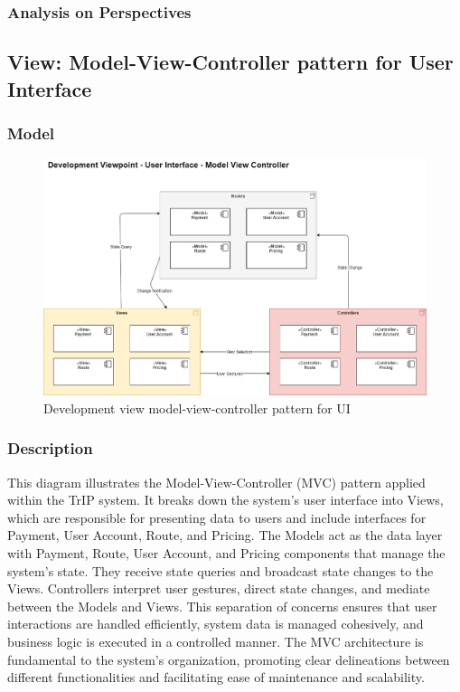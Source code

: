 \subsubsection{Analysis on Perspectives}
\subsection{View: Model-View-Controller pattern for User Interface}
\subsubsection{Model}
\begin{figure}[H]
    \centering
    \includegraphics[width=\textwidth]{drawings/views_final_version/development_view_User_Interface.png}
    \caption{Development view model-view-controller pattern for UI}
    \label{fig:development_view_User_Interface}
\end{figure}

\subsubsection{Description}
This diagram illustrates the Model-View-Controller (MVC) pattern applied within the TrIP system. It breaks down the system's user interface into Views, which are responsible for presenting data to users and include interfaces for Payment, User Account, Route, and Pricing. The Models act as the data layer with Payment, Route, User Account, and Pricing components that manage the system's state. They receive state queries and broadcast state changes to the Views. Controllers interpret user gestures, direct state changes, and mediate between the Models and Views. This separation of concerns ensures that user interactions are handled efficiently, system data is managed cohesively, and business logic is executed in a controlled manner. The MVC architecture is fundamental to the system's organization, promoting clear delineations between different functionalities and facilitating ease of maintenance and scalability.

